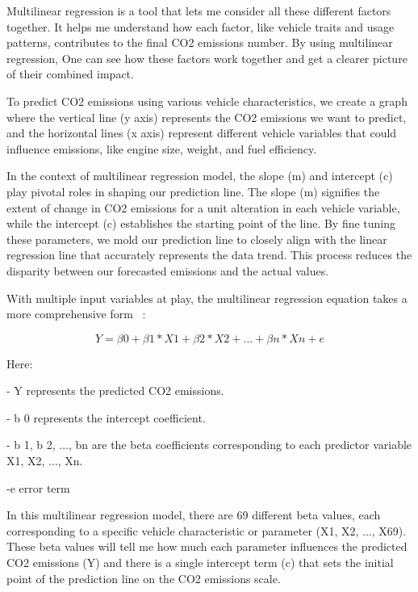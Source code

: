\documentclass[12pt, a4paper,oneside]{book}
\numberwithin{equation}{section}
\begin{document}
Multilinear regression is a tool that lets me consider all these different factors together. It helps me understand how each factor, like vehicle traits and usage patterns, contributes to the final CO2 emissions number. By using multilinear regression, One can see how these factors work together and get a clearer picture of their combined impact.~\cite{ref20}

To predict CO2 emissions using various vehicle characteristics, we create a graph where the vertical line (y axis) represents the CO2 emissions we want to predict, and the horizontal lines (x axis) represent different vehicle variables that could influence emissions, like engine size, weight, and fuel efficiency. 

In the context of multilinear regression model, the slope (m) and intercept (c) play pivotal roles in shaping our prediction line. The slope (m) signifies the extent of change in CO2 emissions for a unit alteration in each vehicle variable, while the intercept (c) establishes the starting point of the line. By fine tuning these parameters, we mold our prediction line to closely align with the linear regression line that accurately represents the data trend. This process reduces the disparity between our forecasted emissions and the actual values.


With multiple input variables at play, the multilinear regression equation takes a more comprehensive form ~\cite{ref15}:

\begin{equation}
  Y =  \beta 0  + \beta 1 * X1 + \beta 2 * X2 + ... + \beta n * Xn + e
\end{equation}

Here:

- Y represents the predicted CO2 emissions.

- b 0 represents the intercept coefficient.

- b 1, b 2, ..., bn are the beta coefficients corresponding to each predictor variable X1, X2, ..., Xn.

-e error term



In this multilinear regression model, there are 69 different beta values, each corresponding to a specific vehicle characteristic or parameter (X1, X2, ..., X69). These beta values will tell me how much each parameter influences the predicted CO2 emissions (Y) and there is  a single intercept term (c) that sets the initial point of the prediction line on the CO2 emissions scale.
\end{document}
